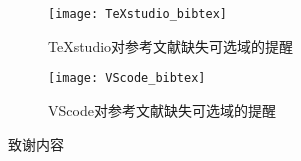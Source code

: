 \documentclass[print, doctor, vlined]{DissertUESTC}
\begin{document}
	\begin{figure}[!h]
		\centering
		\texttt{[image: TeXstudio\_bibtex]}
		\caption{TeXstudio对参考文献缺失可选域的提醒} \label{fig: TeXstudio对参考文献缺失信息的提醒}
	\end{figure}
	\begin{figure}[!h]
		\centering
		\texttt{[image: VScode\_bibtex]}
		\caption{VScode对参考文献缺失可选域的提醒} \label{fig: VScode对参考文献缺失信息的提醒}
	\end{figure}
	
	\acknowledgement
	

	致谢内容



\end{document}
